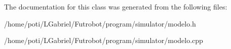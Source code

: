The documentation for this class was generated from the following files\+:\begin{DoxyCompactItemize}
\item 
/home/poti/\+L\+Gabriel/\+Futrobot/program/simulator/modelo.\+h\item 
/home/poti/\+L\+Gabriel/\+Futrobot/program/simulator/modelo.\+cpp\end{DoxyCompactItemize}

